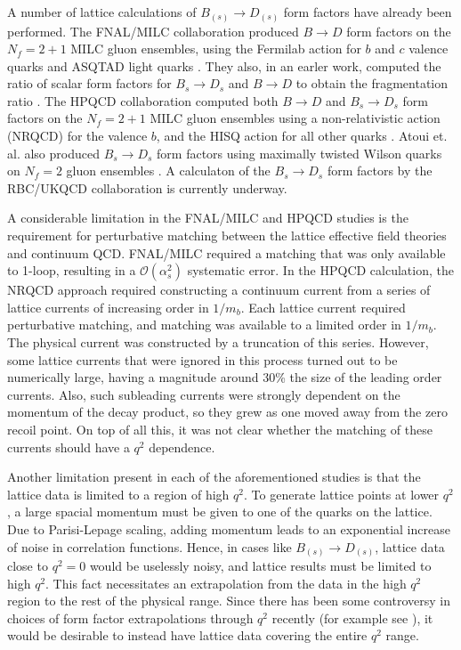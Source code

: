A number of lattice calculations of $B_{(s)} \to D_{(s)}$ form factors have already been performed. The FNAL/MILC collaboration produced $B\to D$ form factors on the $N_f=2+1$ MILC gluon ensembles, using the Fermilab action for $b$ and $c$ valence quarks and ASQTAD light quarks \cite{Lattice:2015rga}. They also, in an earler work, computed the ratio of scalar form factors for $B_s\to D_s$ and $B\to D$ to obtain the fragmentation ratio \cite{PhysRevD.85.114502}. The HPQCD collaboration computed both $B\to D$ and $B_s\to D_s$ form factors on the $N_f=2+1$ MILC gluon ensembles using a non-relativistic action (NRQCD) for the valence $b$, and the HISQ action for all other quarks \cite{Na:2015kha,Monahan:2017uby}. Atoui et. al. also produced $B_s\to D_s$ form factors using maximally twisted Wilson quarks on $N_f=2$ gluon ensembles \cite{Atoui2014}. A calculaton of the $B_s\to D_s$ form factors by the RBC/UKQCD collaboration is currently underway.

A considerable limitation in the FNAL/MILC and HPQCD studies is the requirement for perturbative matching between the lattice effective field theories and continuum QCD. FNAL/MILC required a matching that was only available to 1-loop, resulting in a $\mathcal{O}(\alpha_s^2)$ systematic error. In the HPQCD calculation, the NRQCD approach required constructing a continuum current from a series of lattice currents of increasing order in $1/m_b$. Each lattice current required perturbative matching, and matching was available to a limited order in $1/m_b$. The physical current was constructed by a truncation of this series. However, some lattice currents that were ignored in this process turned out to be numerically large, having a magnitude around 30\% the size of the leading order currents. Also, such subleading currents were strongly dependent on the momentum of the decay product, so they grew as one moved away from the zero recoil point. On top of all this, it was not clear whether the matching of these currents should have a $q^2$ dependence.

Another limitation present in each of the aforementioned studies is that the lattice data is limited to a region of high $q^2$. To generate lattice points at lower $q^2$, a large spacial momentum must be given to one of the quarks on the lattice. Due to Parisi-Lepage scaling, adding momentum leads to an exponential increase of noise in correlation functions. Hence, in cases like $B_{(s)}\to D_{(s)}$, lattice data close to $q^2=0$ would be uselessly noisy, and lattice results must be limited to high $q^2$. This fact necessitates an extrapolation from the data in the high $q^2$ region to the rest of the physical range. Since there has been some controversy in choices of form factor extrapolations through $q^2$ recently (for example see \cite{Bigi:2017njr,Grinstein:2017nlq}), it would be desirable to instead have lattice data covering the entire $q^2$ range.


